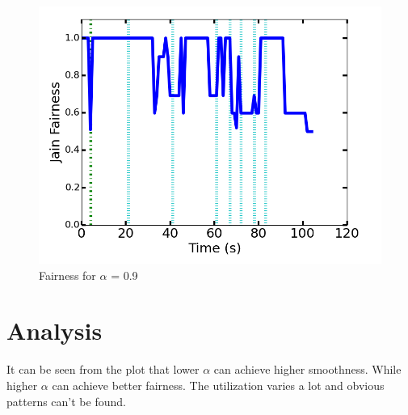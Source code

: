 \documentclass[12pt]{article}
\begin{document}
\begin{figure}
\centering
\includegraphics[scale = 0.75]{exp3/fairness.png}
\caption{Fairness for $\alpha$ = 0.9}
\end{figure}

\section{Analysis}

It can be seen from the plot that lower $\alpha$ can achieve higher smoothness. While higher $\alpha$ can achieve better fairness. The utilization varies a lot and obvious patterns can't be found.
\end{document}

